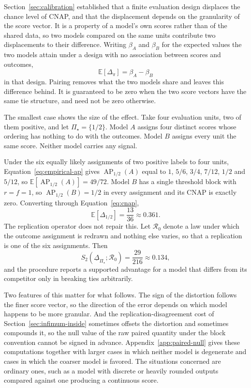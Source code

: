 \documentclass[11pt]{article}
\newcommand{\AP}{\operatorname{AP}}
\newcommand{\Regime}{\mathcal{R}}
\newcommand{\PSet}{\Pi_\star}
\newcommand{\E}{\mathbb{E}}
\newcommand{\RobDelta}{\underline{\Delta}_{\PSet}}
\theoremstyle{remark}
\begin{document}
Section~\ref{sec:calibration} established that a finite evaluation design displaces the chance level of CNAP, and that the displacement depends on the granularity of the score vector. It is a property of a model's own scores rather than of the shared data, so two models compared on the same units contribute two displacements to their difference. Writing $\beta_A$ and $\beta_B$ for the expected values the two models attain under a design with no association between scores and outcomes,
\[
\E[\Delta_\pi]
=
\beta_A-\beta_B
\]
in that design. Pairing removes what the two models share and leaves this difference behind. It is guaranteed to be zero when the two score vectors have the same tie structure, and need not be zero otherwise.

The smallest case shows the size of the effect. Take four evaluation units, two of them positive, and let $\PSet=\{1/2\}$. Model $A$ assigns four distinct scores whose ordering has nothing to do with the outcomes. Model $B$ assigns every unit the same score. Neither model carries any signal.

Under the six equally likely assignments of two positive labels to four units, Equation~\eqref{eq:empirical-ap} gives $\AP_{1/2}(A)$ equal to $1$, $5/6$, $3/4$, $7/12$, $1/2$ and $5/12$, so $\E[\AP_{1/2}(A)]=49/72$. Model $B$ has a single threshold block with $r=f=1$, so $\AP_{1/2}(B)=1/2$ in every assignment and its CNAP is exactly zero. Converting through Equation~\eqref{eq:cnap},
\[
\E\left[\Delta_{1/2}\right]
=
\frac{13}{36}
\approx
0.361 .
\]
The replication operator does not repair this. Let $\Regime_0$ denote a law under which the outcome assignment is redrawn and nothing else varies, so that a replication is one of the six assignments. Then
\[
S_2(\RobDelta;\Regime_0)
=
\frac{29}{216}
\approx
0.134 ,
\]
and the procedure reports a supported advantage for a model that differs from its competitor only in breaking ties arbitrarily.

Two features of this matter for what follows. The sign of the distortion follows the finer score vector, so the direction of the error depends on which model happens to be more granular. And the replication-disagreement cost of Section~\ref{sec:infimum-inside} sometimes offsets the distortion and sometimes compounds it, so the null value of the raw paired quantity under the block convention cannot be signed in advance. Appendix~\ref{app:paired-null} gives these computations together with larger cases in which neither model is degenerate and cases in which the coarser model is favored. The situations concerned are ordinary ones, such as a model with discrete or heavily rounded outputs compared against one producing a continuous score.
\end{document}
